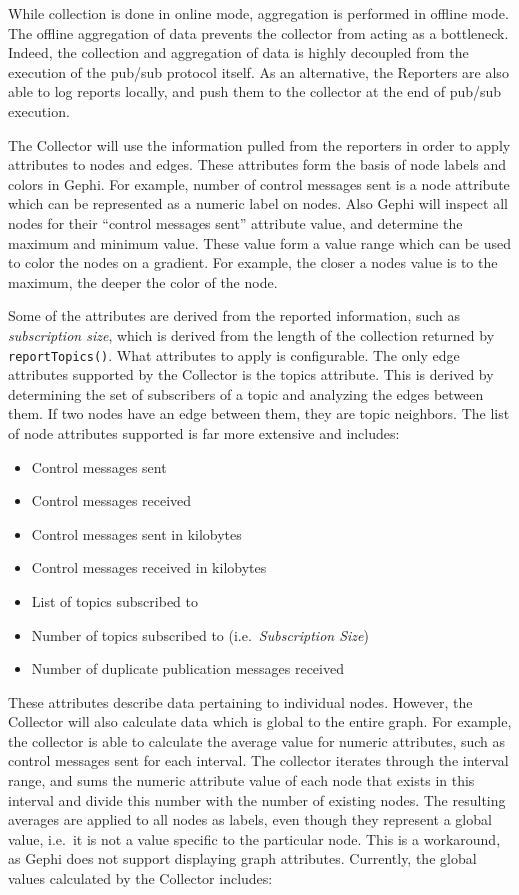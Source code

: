 While collection is done in online mode, aggregation is performed in
offline mode. The offline aggregation of data prevents the collector
from acting as a bottleneck. Indeed, the collection and aggregation of
data is highly decoupled from the execution of the pub/sub protocol
itself. As an alternative, the Reporters are also able to log reports
locally, and push them to the collector at the end of pub/sub execution.

The Collector will use the information pulled from the reporters in
order to apply attributes to nodes and edges. These attributes form the
basis of node labels and colors in Gephi. For example, number of
control messages sent is a node attribute which can be represented as a
numeric label on nodes. Also Gephi will inspect all nodes for their
``control messages sent'' attribute value, and determine the maximum and
minimum value. These value form a value range which can be used to color
the nodes on a gradient. For example, the closer a nodes value is to the
maximum, the deeper the color of the node.

Some of the attributes are derived from the reported information, such
as \emph{subscription size}, which is derived from the length of the
collection returned by \texttt{reportTopics()}. What attributes to apply
is configurable. The only edge attributes supported by the Collector is
the topics attribute. This is derived by determining the set of
subscribers of a topic and analyzing the edges between them. If two
nodes have an edge between them, they are topic neighbors. The list of
node attributes supported is far more extensive and includes:

\begin{itemize}
    \item Control messages sent
    \item Control messages received
    \item Control messages sent in kilobytes
    \item Control messages received in kilobytes
    \item List of topics subscribed to
    \item Number of topics subscribed to (i.e.\ \emph{Subscription Size})
    \item Number of duplicate publication messages received
\end{itemize}

These attributes describe data pertaining to individual nodes. However,
the Collector will also calculate data which is global to the entire
graph. For example, the collector is able to calculate the average value
for numeric attributes, such as control messages sent for each interval.
The collector iterates through the interval range, and sums the numeric
attribute value of each node that exists in this interval and divide
this number with the number of existing nodes. The resulting averages
are applied to all nodes as labels, even though they represent a global
value, i.e.\ it is not a value specific to the particular node. This is a
workaround, as Gephi does not support displaying graph attributes.
Currently, the global values calculated by the Collector includes:

